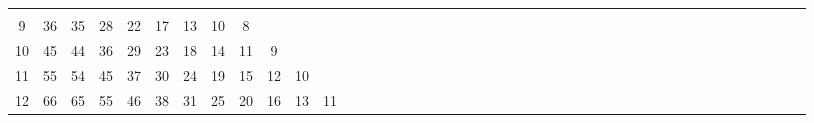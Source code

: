 \documentclass[12pt,a4paper]{amsart}
\theoremstyle{definition} %
\theoremstyle{plain} %
\begin{document}
\begin{table}[h]
{\begin{tabular}{|c|*{44}{c|}}
                               &             &             &             &             &             &             &             &             &             &             &             &             &             &             &             &             &             \\
                     9 &         36 &         35 &         28 &         22 &         17 &         13 &         10 &          8 &            &             &             &             &             &             &             &             &             &             &             &             &             &             &             &             &             &             &  
                               &             &             &             &             &             &             &             &             &             &             &             &             &             &             &             &             &             \\
                    10 &         45 &         44 &         36 &         29 &         23 &         18 &         14 &         11 &          9 &             &             &             &             &             &             &             &             &             &             &             &             &             &             &             &             &             &  
                              &             &             &             &             &             &             &             &             &             &             &             &             &             &             &             &             &             \\
                    11 &         55 &         54 &         45 &         37 &         30 &         24 &         19 &         15 &         12 &          10 &             &             &             &             &             &             &             &             &             &             &             &             &             &             &             &             &  
                              &             &             &             &             &             &             &             &             &             &             &             &             &             &             &             &             &             \\
                    12 &         66 &         65 &         55 &         46 &         38 &         31 &         25 &         20 &         16 &          13 &          11 &             &             &             &             &             &             &             &             &             &             &             &             &             &             &             &  

\end{tabular}}
\end{table}
\end{document}
